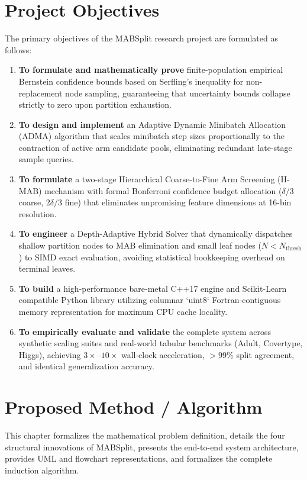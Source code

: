 \documentclass{article}
\begin{document}
	\section{Project Objectives}
	The primary objectives of the MABSplit research project are formulated as follows:
	\begin{enumerate}
		\item \textbf{To formulate and mathematically prove} finite-population empirical Bernstein confidence bounds based on Serfling's inequality for non-replacement node sampling, guaranteeing that uncertainty bounds collapse strictly to zero upon partition exhaustion.
		\item \textbf{To design and implement} an Adaptive Dynamic Minibatch Allocation (ADMA) algorithm that scales minibatch step sizes proportionally to the contraction of active arm candidate pools, eliminating redundant late-stage sample queries.
		\item \textbf{To formulate} a two-stage Hierarchical Coarse-to-Fine Arm Screening (H-MAB) mechanism with formal Bonferroni confidence budget allocation ($\delta/3$ coarse, $2\delta/3$ fine) that eliminates unpromising feature dimensions at 16-bin resolution.
		\item \textbf{To engineer} a Depth-Adaptive Hybrid Solver that dynamically dispatches shallow partition nodes to MAB elimination and small leaf nodes ($N < N_{\text{thresh}}$) to SIMD exact evaluation, avoiding statistical bookkeeping overhead on terminal leaves.
		\item \textbf{To build} a high-performance bare-metal C++17 engine and Scikit-Learn compatible Python library utilizing columnar `uint8` Fortran-contiguous memory representation for maximum CPU cache locality.
		\item \textbf{To empirically evaluate and validate} the complete system across synthetic scaling suites and real-world tabular benchmarks (Adult, Covertype, Higgs), achieving $3\times\text{--}10\times$ wall-clock acceleration, $>99\%$ split agreement, and identical generalization accuracy.
	\end{enumerate}

	\pagebreak	
	
	\section{Proposed Method / Algorithm}
	This chapter formalizes the mathematical problem definition, details the four structural innovations of MABSplit, presents the end-to-end system architecture, provides UML and flowchart representations, and formalizes the complete induction algorithm.
\end{document}
